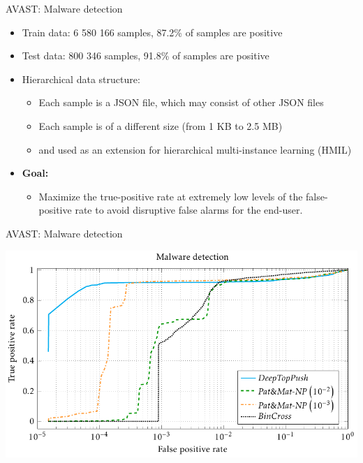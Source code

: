 \documentclass[10pt, aspectratio=169]{beamer}
\begin{document}
\begin{frame}{AVAST: Malware detection}
  \begin{itemize}
    \item Train data: 6 580 166 samples, 87.2\% of samples are positive
    \item Test data: 800 346 samples, 91.8\% of samples are positive
    \item Hierarchical data structure:
    \begin{itemize}
      \item Each sample is a JSON file, which may consist of other JSON files
      \item Each sample is of a different size (from 1 KB to 2.5 MB)
      \item \DeepTopPush and \PatMatNP used as an extension for hierarchical multi-instance learning (HMIL)
    \end{itemize}
    \item \textbf{Goal:}
    \begin{itemize}
      \item Maximize the true-positive rate at extremely low levels of the false-positive rate to avoid disruptive false alarms for the end-user.
    \end{itemize}
  \end{itemize}
\end{frame}

\begin{frame}{AVAST: Malware detection}
  \begin{center}
    \includegraphics[width=\linewidth, height=0.9\textheight, keepaspectratio]{
      ../images/malware_detection.pdf
    }
  \end{center}
\end{frame}
\end{document}
